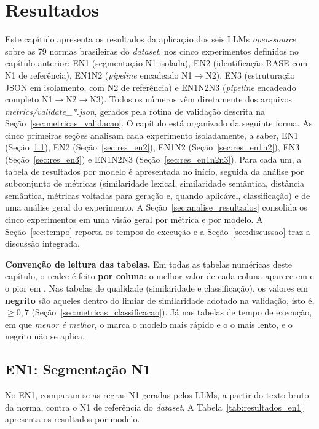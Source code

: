 \chapter{Resultados}

Este capítulo apresenta os resultados da aplicação dos seis LLMs \textit{open-source} sobre as 79 normas brasileiras do \textit{dataset}, nos cinco experimentos definidos no capítulo anterior: EN1 (segmentação N1 isolada), EN2 (identificação RASE com N1 de referência), EN1N2 (\textit{pipeline} encadeado N1$\rightarrow$N2), EN3 (estruturação JSON em isolamento, com N2 de referência) e EN1N2N3 (\textit{pipeline} encadeado completo N1$\rightarrow$N2$\rightarrow$N3). Todos os números vêm diretamente dos arquivos \textit{metrics/validate\_*.json}, gerados pela rotina de validação descrita na Seção~\ref{sec:metricas_validacao}. O capítulo está organizado da seguinte forma. As cinco primeiras seções analisam cada experimento isoladamente, a saber, EN1 (Seção~\ref{sec:res_en1}), EN2 (Seção~\ref{sec:res_en2}), EN1N2 (Seção~\ref{sec:res_en1n2}), EN3 (Seção~\ref{sec:res_en3}) e EN1N2N3 (Seção~\ref{sec:res_en1n2n3}). Para cada um, a tabela de resultados por modelo é apresentada no início, seguida da análise por subconjunto de métricas (similaridade lexical, similaridade semântica, distância semântica, métricas voltadas para geração e, quando aplicável, classificação) e de uma análise geral do experimento. A Seção~\ref{sec:analise_resultados} consolida os cinco experimentos em uma visão geral por métrica e por modelo. A Seção~\ref{sec:tempo} reporta os tempos de execução e a Seção~\ref{sec:discussao} traz a discussão integrada.

\textbf{Convenção de leitura das tabelas.} Em todas as tabelas numéricas deste capítulo, o realce é feito \textbf{por coluna}: o melhor valor de cada coluna aparece em  e o pior em . Nas tabelas de qualidade (similaridade e classificação), os valores em \textbf{negrito} são aqueles dentro do limiar de similaridade adotado na validação, isto é, \(\geq 0{,}7\) (Seção~\ref{sec:metricas_classificacao}). Já nas tabelas de tempo de execução, em que \emph{menor é melhor}, o  marca o modelo mais rápido e o  o mais lento, e o negrito não se aplica.

\section{EN1: Segmentação N1}
\label{sec:res_en1}

No EN1, comparam-se as regras N1 geradas pelos LLMs, a partir do texto bruto da norma, contra o N1 de referência do \textit{dataset}. A Tabela~\ref{tab:resultados_en1} apresenta os resultados por modelo.

